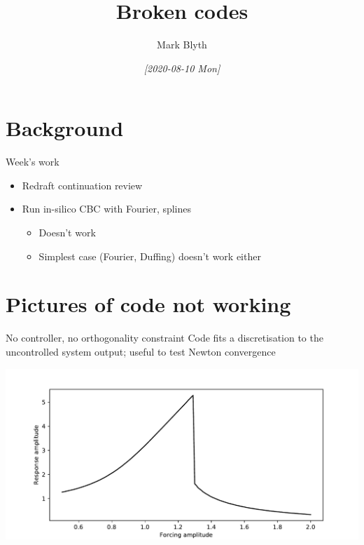 \documentclass[presentation]{beamer}
\author{Mark Blyth}
\date{\textit{[2020-08-10 Mon]}}
\title{Broken codes}
\begin{document}
\maketitle

\section{Background}
\label{sec:orgf735b68}
\begin{frame}[label={sec:orgda53278}]{Week's work}
\begin{itemize}
\item Redraft continuation review
\item Run in-silico CBC with Fourier, splines
\begin{itemize}
\item Doesn't work
\item Simplest case (Fourier, Duffing) doesn't work either
\end{itemize}
\end{itemize}
\end{frame}
\section{Pictures of code not working}
\label{sec:orge958f2c}
\begin{frame}[label={sec:org9345845}]{No controller, no orthogonality constraint}
Code fits a discretisation to the uncontrolled system output; useful to test Newton convergence

\begin{center}
\includegraphics[width=.9\linewidth]{./nonorthogonal-controlfree.pdf}
\end{center}
\end{frame}
\end{document}
